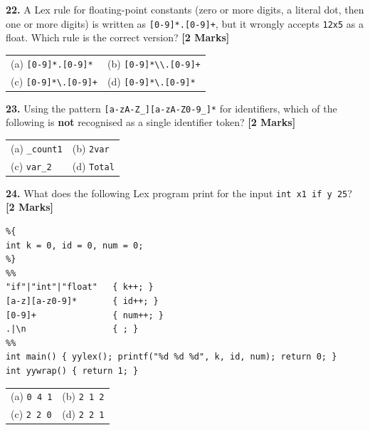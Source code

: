\documentclass[11pt,a4paper]{article}
\begin{document}
\vspace{0.22cm}

\noindent \textbf{22.} A Lex rule for floating-point constants (zero or more digits, a literal dot, then one or more digits) is written as \verb|[0-9]*.[0-9]+|, but it wrongly accepts \texttt{12x5} as a float. Which rule is the correct version? \hfill \textbf{[2 Marks]}
\vspace{0.06cm}
\noindent
\begin{tabularx}{\textwidth}{@{}X X@{}}
(a) \verb|[0-9]*.[0-9]*| & (b) \verb|[0-9]*\\.[0-9]+| \\[3pt]
(c) \verb|[0-9]*\.[0-9]+| & (d) \verb|[0-9]*\.[0-9]*| \\
\end{tabularx}

\vspace{0.22cm}

\noindent \textbf{23.} Using the pattern \texttt{[a-zA-Z\_][a-zA-Z0-9\_]*} for identifiers, which of the following is \textbf{not} recognised as a single identifier token? \hfill \textbf{[2 Marks]}
\vspace{0.06cm}
\noindent
\begin{tabularx}{\textwidth}{@{}X X@{}}
(a) \texttt{\_count1} & (b) \texttt{2var} \\[3pt]
(c) \texttt{var\_2} & (d) \texttt{Total} \\
\end{tabularx}

\vspace{0.22cm}

\noindent \textbf{24.} What does the following Lex program print for the input \texttt{int x1 if y 25}? \hfill \textbf{[2 Marks]}
\begin{lstlisting}
%{
int k = 0, id = 0, num = 0;
%}
%%
"if"|"int"|"float"   { k++; }
[a-z][a-z0-9]*       { id++; }
[0-9]+               { num++; }
.|\n                 { ; }
%%
int main() { yylex(); printf("%d %d %d", k, id, num); return 0; }
int yywrap() { return 1; }
\end{lstlisting}
\vspace{0.06cm}
\noindent
\begin{tabularx}{\textwidth}{@{}X X@{}}
(a) \texttt{0 4 1} & (b) \texttt{2 1 2} \\[3pt]
(c) \texttt{2 2 0} & (d) \texttt{2 2 1} \\
\end{tabularx}

\vspace{0.22cm}
\end{document}
